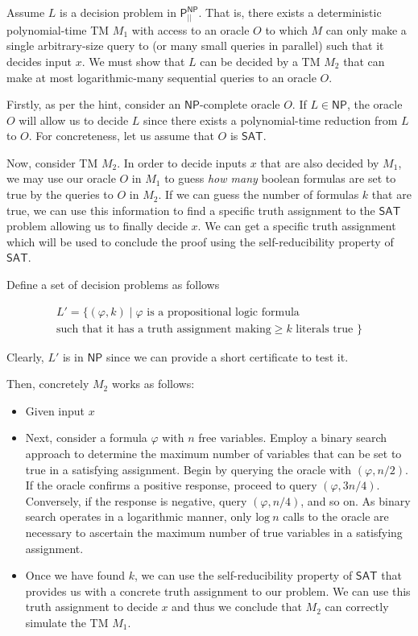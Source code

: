 \begin{question}
\begin{answer}
        Assume $L$ is a decision problem in $\mathsf{P}_{||}^{\mathsf{NP}} $. That is, there exists a deterministic polynomial-time TM $M_1$ with access to an oracle $O$ to which $M$ can only make a single arbitrary-size query to (or many small queries in parallel) such that it decides input $x$. We must show that $L$ can be decided by a TM $M_2$ that can make at most logarithmic-many sequential queries to an oracle $O$.

        \par Firstly, as per the hint, consider an $\mathsf{NP}$-complete oracle $O$. If $L \in \mathsf{NP}$, the oracle $O$ will allow us to decide $L$ since there exists a polynomial-time reduction from $L$ to $O$. For concreteness, let us assume that $O$ is $\mathsf{SAT}$.

        \par Now, consider TM $M_2$. In order to decide inputs $x$ that are also decided by $M_1$, we may use our oracle $O$ in $M_1$ to guess \textit{how many} boolean formulas are set to true by the queries to $O$ in $M_2$. If we can guess the number of formulas $k$ that are true, we can use this information to find a specific truth assignment to the $\mathsf{SAT}$ problem allowing us to finally decide $x$. We can get a specific truth assignment which will be used to conclude the proof using the self-reducibility property of $\mathsf{SAT}$.

        Define a set of decision problems as follows

        \begin{gather*}
            L'=\{(\varphi, k)\mid \varphi \text{ is a propositional logic formula}
            \\
            \text{such that it has a truth assignment making} \geq k \text{ literals true } \}
        \end{gather*}

        Clearly, $L'$ is in $\mathsf{NP}$ since we can provide a short certificate to test it.

        Then, concretely $M_2$ works as follows:
        \begin{itemize}
            \item Given input $x$
            \item Next, consider a formula $\varphi$ with $n$ free variables. Employ a binary search approach to determine the maximum number of variables that can be set to true in a satisfying assignment. Begin by querying the oracle with $(\varphi, n/2)$. If the oracle confirms a positive response, proceed to query $(\varphi, 3n/4)$. Conversely, if the response is negative, query $(\varphi, n/4)$, and so on. As binary search operates in a logarithmic manner, only $\text{log} \ n$ calls to the oracle are necessary to ascertain the maximum number of true variables in a satisfying assignment.
            \item Once we have found $k$, we can use the self-reducibility property of $\mathsf{SAT}$ that provides us with a concrete truth assignment to our problem. We can use this truth assignment to decide $x$ and thus we conclude that $M_2$ can correctly simulate the TM $M_1$.
        \end{itemize}


\end{answer}
\end{question}
